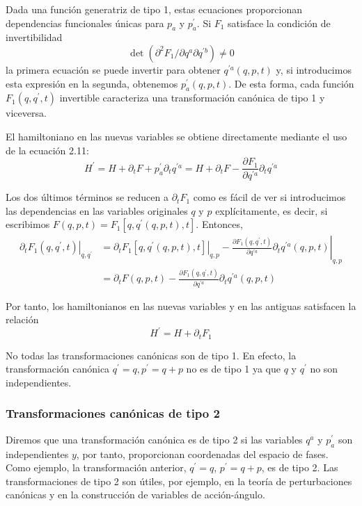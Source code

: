 Dada una función generatriz de tipo 1, estas ecuaciones proporcionan dependencias funcionales únicas para $p_{a}$ y $p_{a}^{\prime}$. Si $F_{1}$ satisface la condición de invertibilidad
$$
\operatorname{det}\left(\partial^{2} F_{1} / \partial q^{a} \partial q^{\prime b}\right) \neq 0
$$
la primera ecuación se puede invertir para obtener $q^{\prime a}(q, p, t)$ y, si introducimos esta expresión en la segunda, obtenemos $p_{a}^{\prime}(q, p, t)$. De esta forma, cada función $F_{1}\left(q, q^{\prime}, t\right)$ invertible caracteriza una transformación canónica de tipo 1 y viceversa.

El hamiltoniano en las nuevas variables se obtiene directamente mediante el uso de la ecuación 2.11:
$$
H^{\prime}=H+\partial_{t} F+p_{a}^{\prime} \partial_{t} q^{\prime a}=H+\partial_{t} F-\frac{\partial F_{1}}{\partial q^{\prime a}} \partial_{t} q^{\prime a}
$$

Los dos últimos términos se reducen a $\partial_{t} F_{1}$ como es fácil de ver si introducimos las dependencias en las variables originales $q$ y $p$ explícitamente, es decir, si escribimos $F(q, p, t)=F_{1}\left[q, q^{\prime}(q, p, t), t\right]$. Entonces,
$$
\begin{aligned}
\left.\partial_{t} F_{1}\left(q, q^{\prime}, t\right)\right|_{q, q^{\prime}} & =\left.\partial_{t} F_{1}\left[q, q^{\prime}(q, p, t), t\right]\right|_{q, p}-\left.\frac{\partial F_{1}\left(q, q^{\prime}, t\right)}{\partial q^{\prime a}} \partial_{t} q^{\prime a}(q, p, t)\right|_{q, p} \\
& =\partial_{t} F(q, p, t)-\frac{\partial F_{1}\left(q, q^{\prime}, t\right)}{\partial q^{\prime a}} \partial_{t} q^{\prime a}(q, p, t)
\end{aligned}
$$

Por tanto, los hamiltonianos en las nuevas variables y en las antiguas satisfacen la relación
$$
\begin{equation*}
H^{\prime}=H+\partial_{t} F_{1} \tag{2.13}
\end{equation*}
$$

No todas las transformaciones canónicas son de tipo 1. En efecto, la transformación canónica $q^{\prime}=q, p^{\prime}=q+p$ no es de tipo 1 ya que $q$ y $q^{\prime}$ no son independientes.
\subsubsection{Transformaciones canónicas de tipo 2}
Diremos que una transformación canónica es de tipo 2 si las variables $q^{a}$ y $p_{a}^{\prime}$ son independientes $y$, por tanto, proporcionan coordenadas del espacio de fases. Como ejemplo, la transformación anterior, $q^{\prime}=q$, $p^{\prime}=q+p$, es de tipo 2. Las transformaciones de tipo 2 son útiles, por ejemplo, en la teoría de perturbaciones canónicas y en la construcción de variables de acción-ángulo.

